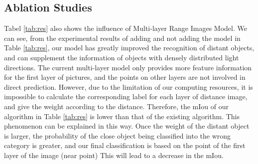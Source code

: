 \documentclass[final]{cvpr}
\begin{document}
\subsection{Ablation Studies}
Tabel \ref{tab:res} also shows the influence of Multi-layer Range Images Model. We can see, from the experimental results of adding and not adding the model in Table \ref{tab:res}, our model has greatly improved the recognition of distant objects, and can supplement the information of objects with densely distributed light directions.  The current multi-layer model only provides more feature information for the first layer of pictures, and the points on other layers are not involved in direct prediction. However, due to the limitation of our computing resources, it is impossible to calculate the corresponding label for each layer of distance image, and give the weight according to the distance. Therefore, the mIou of our algorithm in Table \ref{tab:res} is lower than that of the existing algorithm. This phenomenon can be explained in this way. Once the weight of the distant object is larger, the probability of the close object being classified into the wrong category is greater, and our final classification is based on the point of the first layer of the image (near point)  This will lead to a decrease in the mIou.

\end{document}
